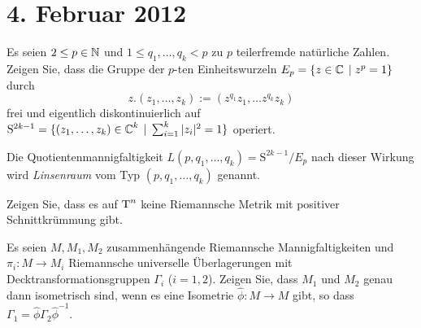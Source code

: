 
\section{4. Februar 2012}
\setcounter{Aufg}{0} %
\setcounter{Loes}{0}

\begin{Aufg}
Es seien $2\leq p \in \operatorname{\mathbb{N}}$ und $1\leq q_1,\dots,q_k<p$ zu $p$ teilerfremde natürliche Zahlen. Zeigen Sie, dass die Gruppe der $p$-ten Einheitswurzeln $E_p=\{z \in \operatorname{\mathbb{C}}\;|\;z^p=1\}$ durch
	\[z.(z_1,\dots, z_k):=(z^{q_1}z_1,\dots z^{q_k} z_k)\]
frei und eigentlich diskontinuierlich auf $\mathrm{S}^{2k-1}=\{(z_1, \dots, z_k) \in \operatorname{\mathbb{C}}^k \;|\;\sum_{i=1}^k |z_i|^2 =1\}$ operiert.

Die Quotientenmannigfaltigkeit $L(p,q_1,\dots, q_k)=\mathrm{S}^{2k-1}/E_p$ nach dieser Wirkung wird \emph{Linsenraum} vom Typ $(p,q_1,\dots,q_k)$ genannt.
\end{Aufg}

\begin{Aufg}
Zeigen Sie, dass es auf $\operatorname{T}^n$ keine Riemannsche Metrik mit positiver Schnittkrümmung gibt.
\end{Aufg}

\begin{Aufg}
Es seien $M, M_1,M_2$ zusammenhängende Riemannsche Mannigfaltigkeiten und $\pi_i:M \to M_i$ Riemannsche universelle Überlagerungen mit Decktransformationsgruppen $\Gamma_i$ ($i=1,2$). Zeigen Sie, dass $M_1$ und $M_2$ genau dann isometrisch sind, wenn es eine Isometrie $\hat{\phi}:M \to M$ gibt, so dass $\Gamma_1=\hat{\phi} \Gamma_2 \hat{\phi}^{-1}$.
\end{Aufg}

